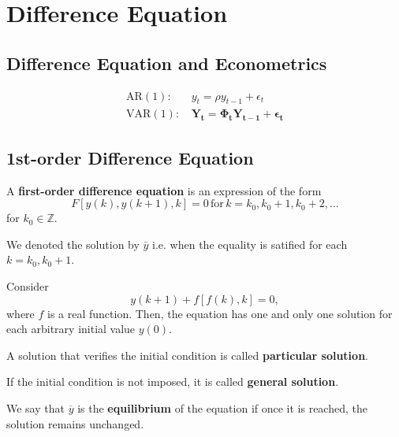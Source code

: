 
\section{Difference Equation}

\subsection{Difference Equation and Econometrics}
\begin{align*}
    \text{AR}(1):  & \, y_{t} = \rho y_{t-1} + \epsilon_{t}                                                 \\
    \text{VAR}(1): & \, \mathbf{Y_{t}} = \boldsymbol{\Phi_{t}} \mathbf{Y_{t-1}} + \boldsymbol{\epsilon_{t}}
\end{align*}

\subsection{1st-order Difference Equation}

\begin{definition}
    A \textbf{first-order difference equation} is an expression of the form \[
        F[y(k), y(k+1),k] = 0 \, \text{for} \, k=k_0,k_0+1,k_0+2,...
    \]
    for \(k_{0} \in \mathbb{Z}\).

    We denoted the solution by $\bar{y}$ i.e. when the equality is satified for each $k = k_{0}, k_{0} + 1$.
\end{definition}


\begin{theorem}
    Consider \[
        y(k+1) + f[f(k),k] = 0,
    \]
    where $f$ is a real function. Then, the equation has one and only one solution for each arbitrary initial value $y(0)$.
\end{theorem}


\begin{definition}
    A solution that verifies the initial condition is called \textbf{particular solution}.
\end{definition}

\begin{definition}
    If the initial condition is not imposed, it is called \textbf{general solution}.
\end{definition}

\begin{definition}
    We say that \(\overline{y}\) is the \textbf{equilibrium} of the equation if once it is reached, the solution remains unchanged.
\end{definition}

